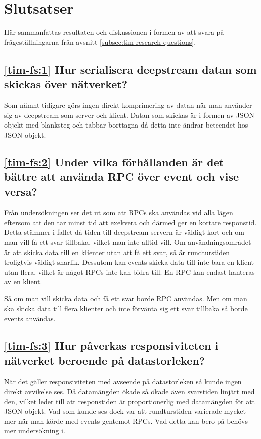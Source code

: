 \section{Slutsatser}
\label{sec:tim-conclusion}
Här sammanfattas resultaten och diskussionen i formen av att svara på frågeställningarna från avsnitt \ref{subsec:tim-research-questions}.

\subsection*{\ref{tim-fs:1} Hur serialisera deepstream datan som skickas över nätverket?}
Som nämnt tidigare görs ingen direkt komprimering av datan när man använder sig av deepstream som server och klient. Datan som skickas är i formen av JSON-objekt med blanksteg och tabbar borttagna då detta inte ändrar beteendet hos JSON-objekt.

\subsection*{\ref{tim-fs:2} Under vilka förhållanden är det bättre att använda RPC över event och vise versa?}
Från undersökningen ser det ut som att RPCs ska användas vid alla lägen eftersom att den tar minst tid att exekvera och därmed ger en kortare responstid. Detta stämmer i fallet då tiden till deepstream servern är väldigt kort och om man vill få ett svar tillbaka, vilket man inte alltid vill. Om användningsområdet är att skicka data till en klienter utan att få ett svar, så är rundturstiden troligtvis väldigt snarlik. Dessutom kan events skicka data till inte bara en klient utan flera, vilket är något RPCs inte kan bidra till. En RPC kan endast hanteras av en klient.

Så om man vill skicka data och få ett svar borde RPC användas. Men om man ska skicka data till flera klienter och inte förvänta sig ett svar tillbaka så borde events användas.

\subsection*{\ref{tim-fs:3} Hur påverkas responsiviteten i nätverket beroende på datastorleken?}
När det gäller responsiviteten med avseende på datastorleken så kunde ingen direkt avvikelse ses. Då datamängden ökade så ökade även svarstiden linjärt med den, vilket leder till att responstiden är proportionerlig med datamängden för att JSON-objekt. Vad som kunde ses dock var att rundturstiden varierade mycket mer när man körde med events gentemot RPCs. Vad detta kan bero på behövs mer undersökning i.
